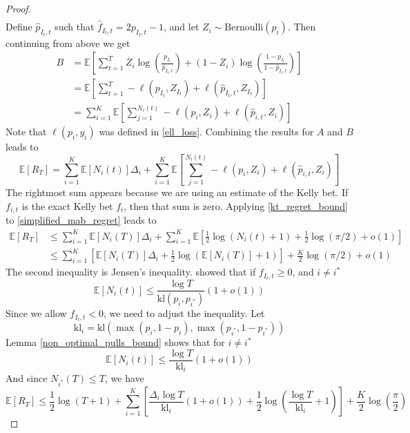 \documentclass[letterpaper]{article}
\numberwithin{equation}{section}
\theoremstyle{plain}
\begin{document}
\begin{proof}
\begin{align}
\end{align}
Define $\hat{p}_{I_t,t}$ such that $\hat{f}_{I_t,t} = 2p_{I_t,t}-1$, and let $Z_i\sim\text{Bernoulli}({p_i})$. Then continuing from above we get
\begin{align}
B &= \mathbb{E}\left[\sum_{t=1}^T Z_i \log\left(\frac{p_{I_t}}{\hat{p}_{I_t,t}}\right) + (1-Z_i)\log\left(\frac{1-p_{I_t}}{1-\hat{p}_{I_t,t}}\right) \right]\\
&= \mathbb{E}\left[\sum_{t=1}^T-\ell(p_{I_t},Z_{I_t}) + \ell(\hat{p}_{I_t,t},Z_{I_t}) \right]\\
&= \sum_{i=1}^K \mathbb{E}\left[ \sum_{j=1}^{N_i(t)} -\ell(p_i,Z_i) + \ell(\hat{p}_{i,t},Z_i)\right]
\end{align}
Note that $\ell(p_i,y_i)$ was defined in \eqref{ell_loss}.
Combining the results for $A$ and $B$ leads to
\begin{equation}\label{simplified_mab_regret}
\mathbb{E}[R_T] = \sum_{i=1}^K \mathbb{E}[N_i(t)] \Delta_i + \sum_{i=1}^K \mathbb{E}\left[ \sum_{j=1}^{N_i(t)} -\ell(p_i,Z_i) + \ell(\hat{p}_{i,t},Z_i)\right]
\end{equation}
The rightmost sum appears because we are using an estimate of the Kelly bet. If $f_{i,t}$ is the exact Kelly bet $f_i$, then that sum is zero. Applying \eqref{kt_regret_bound} to \eqref{simplified_mab_regret} leads to
\begin{align}
\mathbb{E}[R_T] &\le \sum_{i=1}^K \mathbb{E}[N_i(T)]\Delta_i+ \sum_{i=1}^K \mathbb{E}\left[\frac{1}{2} \log (N_i(t)+1) + \frac{1}{2}\log(\pi/2) + o(1)\right]\\
&\le \sum_{i=1}^K \left[\mathbb{E}[N_i(T)]\Delta_i + \frac{1}{2} \log(\mathbb{E}[N_i(T)]+1) \right] + \frac{K}{2} \log(\pi/2) + o(1)
\end{align}
The second inequality is Jensen's inequality. \cite{cappe2013kullback} showed that if $f_{I_t,t} \ge 0$,  and $i\neq i^*$
\begin{equation}\label{eq:cappe_bound}
\mathbb{E}[N_i(t)] \le \frac{\log T}{\text{kl}(p_i,p_{i^*})}(1+o(1))
\end{equation}
Since we allow $f_{I_t,t}<0$, we need to adjust the inequality. Let
\begin{equation}
\text{kl}_i = \text{kl}(\max(p_i,1-p_i),\max(p_{i^*}, 1-p_{i^*}))
\end{equation}
Lemma \ref{non_optimal_pulls_bound} shows that for $i\neq i^*$
\begin{equation}\label{eq:kelly_ucb_regret_bound}
\mathbb{E}[N_i(t)] \le \frac{\log T}{\text{kl}_i}(1+o(1))
\end{equation}
And since $N_{i^*}(T) \le T$, we have
\begin{equation}\label{eq:kl_ucb_regret_bound}
\mathbb{E}[R_T] \le \frac{1}{2}\log (T+1) + \sum_{i=1}^K
\left[\frac{\Delta_i\log T}{\text{kl}_i}(1+o(1)) + \frac{1}{2} \log\left(\frac{\log T}{\text{kl}_i} + 1\right) \right] + \frac{K}{2}\log\left(\frac{\pi}{2}\right)
\end{equation}
\end{proof}
\end{document}
